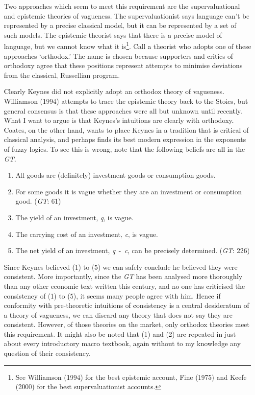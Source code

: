 \documentclass[noflushend]{philosophersimprint}
\begin{document}
Two approaches which seem to meet this requirement are the
supervaluational and epistemic theories of vagueness. The
supervaluationist says language can't be represented by a precise
classical model, but it can be represented by a set of such models. The
epistemic theorist says that there is a precise model of language, but
we cannot know what it is\footnote{See Williamson (1994) for the best
  epistemic account, Fine (1975) and Keefe (2000) for the best
  supervaluationist accounts.}. Call a theorist who adopts one of these
approaches `orthodox.' The name is chosen because supporters and critics
of orthodoxy agree that these positions represent attempts to minimise
deviations from the classical, Russellian program.

Clearly Keynes did not explicitly adopt an orthodox theory of vagueness.
Williamson (1994) attempts to trace the epistemic theory back to the
Stoics, but general consensus is that these approaches were all but
unknown until recently. What I want to argue is that Keynes's intuitions
are clearly with orthodoxy. Coates, on the other hand, wants to place
Keynes in a tradition that is critical of classical analysis, and
perhaps finds its best modern expression in the exponents of fuzzy
logics. To see this is wrong, note that the following beliefs are all in
the \emph{GT}.

\begin{enumerate}
\def\labelenumi{\arabic{enumi}.}
\item
  All goods are (definitely) investment goods or consumption goods.
\item
  For some goods it is vague whether they are an investment or
  consumption good. (\emph{GT}: 61)
\item
  The yield of an investment, \emph{q}, is vague.
\item
  The carrying cost of an investment, \emph{c}, is vague.
\item
  The net yield of an investment, \emph{q}~-~\emph{c}, can be precisely
  determined. (\emph{GT}: 226)
\end{enumerate}

Since Keynes believed (1) to (5) we can safely conclude he believed they
were consistent. More importantly, since the \emph{GT} has been analysed
more thoroughly than any other economic text written this century, and
no one has criticised the consistency of (1) to (5), it seems many
people agree with him. Hence if conformity with pre-theoretic intuitions
of consistency is a central desideratum of a theory of vagueness, we can
discard any theory that does not say they are consistent. However, of
those theories on the market, only orthodox theories meet this
requirement. It might also be noted that (1) and (2) are repeated in
just about every introductory macro textbook, again without to my
knowledge any question of their consistency.
\end{document}
